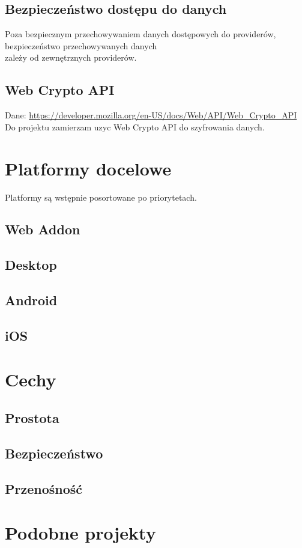 \documentclass[11pt, a4paper]{article}
\begin{document}
\subsection{Bezpieczeństwo dostępu do danych}
Poza bezpiecznym przechowywaniem danych dostępowych do providerów, 
bezpieczeństwo przechowywanych danych \\
zależy od zewnętrznych providerów.
\subsection{Web Crypto API}
Dane: \url{https://developer.mozilla.org/en-US/docs/Web/API/Web_Crypto_API}
Do projektu zamierzam uzyc Web Crypto API do szyfrowania danych.

\section{Platformy docelowe}
Platformy są wstępnie posortowane po priorytetach.
\subsection{Web Addon}
\subsection{Desktop}
\subsection{Android}
\subsection{iOS}

\section{Cechy}
\subsection{Prostota}
\subsection{Bezpieczeństwo}
\subsection{Przenośność}

\section{Podobne projekty}
\end{document}
